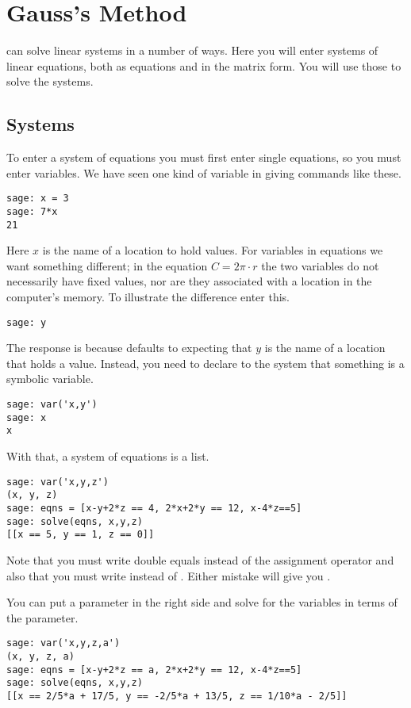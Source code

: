 \chapter{Gauss's Method}

\Sage{} can solve linear systems in a number of ways.
Here you will enter systems of linear equations,
both as equations and in the matrix form.
You will use those to solve the systems. 



\section{Systems}
To enter a system of equations you must first enter single equations, so 
you must enter variables.
We have seen one kind of variable in giving commands like these.
\begin{lstlisting}[style=python]
sage: x = 3
sage: 7*x
21  
\end{lstlisting}
Here $x$ is the name of a location to hold values.
For variables in equations we want something different; in the equation
$C=2\pi\cdot r$ the two variables do not necessarily have fixed values, nor
are they associated with a location in the computer's memory. 
To illustrate the difference enter this.
\begin{lstlisting}
sage: y
\end{lstlisting}
The response is  because
\Sage{} defaults to expecting that
$y$ is the name of a location that holds a value.
Instead, you need to
declare to the system that something is a symbolic variable.
\begin{lstlisting}
sage: var('x,y')
sage: x
x
\end{lstlisting}
With that, a system of equations is a list.
\begin{lstlisting}
sage: var('x,y,z')                                  
(x, y, z)
sage: eqns = [x-y+2*z == 4, 2*x+2*y == 12, x-4*z==5]
sage: solve(eqns, x,y,z)                            
[[x == 5, y == 1, z == 0]]
\end{lstlisting}
Note that you must write double equals \inlinecode{==} instead of 
the assignment operator \inlinecode{=} and also that
you must write 
instead of  
.
Either mistake will give you  
.

You can put a parameter in the right side and solve for the variables
in terms of the parameter.
\begin{lstlisting}
sage: var('x,y,z,a')                                
(x, y, z, a)
sage: eqns = [x-y+2*z == a, 2*x+2*y == 12, x-4*z==5]
sage: solve(eqns, x,y,z)  
[[x == 2/5*a + 17/5, y == -2/5*a + 13/5, z == 1/10*a - 2/5]] 
\end{lstlisting}



